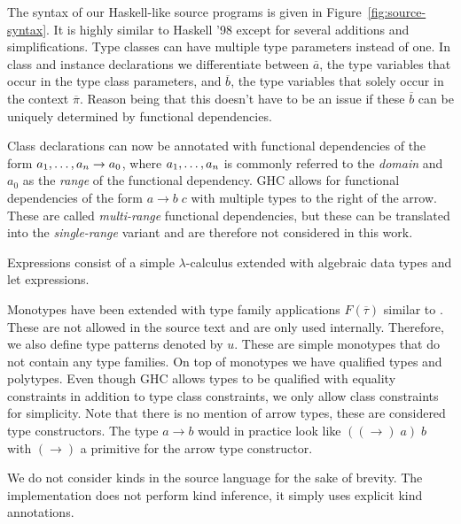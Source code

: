 The syntax of our Haskell-like source programs is given in
Figure~\ref{fig:source-syntax}. It is highly similar to Haskell '98 except for
several additions and simplifications. Type classes can have
multiple type parameters instead of one. In class and instance declarations we
differentiate between $\overline{a}$, the type variables that occur in the type
class parameters, and $\overline{b}$, the type variables that solely occur in the
context $\overline{\pi}$. Reason being that this doesn't have to be an issue if
these $\overline{b}$ can be uniquely determined by functional dependencies.

Class declarations can now be annotated with functional dependencies of the form
$a_1, \mathellipsis, a_n \rightarrow a_0$, where $a_1, \mathellipsis, a_n$ is
commonly referred to the \textit{domain} and $a_0$ as the \textit{range} of the
functional dependency. GHC allows for functional dependencies of the form $a
\rightarrow b \; c$ with multiple types to the right of the arrow. These are
called \textit{multi-range} functional dependencies, but these can be translated
into the \textit{single-range} variant \cite{fundeps-chrs} and are therefore not
considered in this work.

Expressions consist of a simple $\lambda$-calculus extended with algebraic data
types and let expressions.

Monotypes have been extended with type family applications $F(\overline{\tau})$
\cite{associated-types-with-class} similar to \systemfc. These are not
allowed in the source text and are only used internally. Therefore, we also
define type patterns denoted by $u$. These are simple monotypes that do not
contain any type families. On top of monotypes we have qualified types and
polytypes. Even though GHC allows types to be qualified with equality
constraints in addition to type class constraints, we only allow class
constraints for simplicity. Note that there is no mention of arrow types, these
are considered type constructors. The type $a \rightarrow b$ would in practice
look like $((\rightarrow) \; a) \; b$ with $(\rightarrow)$ a primitive for the
arrow type constructor.

We do not consider kinds in the source language for the sake of brevity. The
implementation does not perform kind inference, it simply uses explicit kind
annotations.

